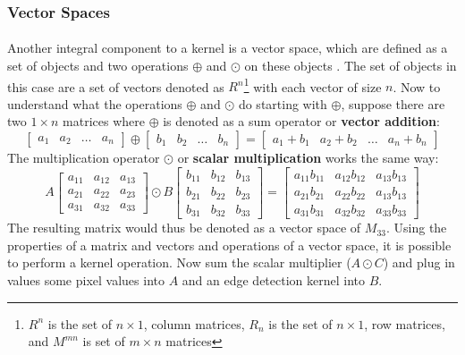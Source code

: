 \documentclass[11pt]{article}
\newcommand\simpleparagraph[1]{%
	\stepcounter{paragraph}\paragraph*{\theparagraph\quad{}#1}}
\renewcommand\theparagraph{}
\begin{document}
\subsubsection{Vector Spaces}
\simpleparagraph{}
Another integral component to a kernel is a vector space, which are defined as a set of objects and two operations $\oplus$ and $\odot$ on these objects \cite{weisstein_vector_2018}. The set of objects in this case are a set of vectors denoted as $R^{n}$\footnote{$R^{n}$ is the set of $n\times 1$, column matrices, $R_{n}$ is the set of $n\times 1$, row matrices, and $M^{mn}$ is set of $m\times n$ matrices} with each vector of size $n$. Now to understand what the operations $\oplus$ and $\odot$ do starting with $\oplus$, suppose there are two $1\times n$ matrices where $\oplus$ is denoted as a sum operator or \textbf{vector addition}:
{ \small
\begin{equation}
	\begin{bmatrix}
	a_{1} & a_{2} & \dots & a_{n}
	\end{bmatrix}
	\oplus
	\begin{bmatrix}
	b_{1} & b_{2} & \dots & b_{n}
	\end{bmatrix}
	=
	\begin{bmatrix}
	a_{1}+b_{1} & a_{2}+b_{2} & \dots & a_{n}+b_{n}
	\end{bmatrix}
\end{equation}
}
The multiplication operator $\odot$ or \textbf{scalar multiplication} works the same way:
{ \small
\begin{equation}
	A
	\begin{bmatrix}
	a_{11} & a_{12} & a_{13}\\
	a_{21} & a_{22} & a_{23}\\
	a_{31} & a_{32} & a_{33}
	\end{bmatrix}
	\odot
	B
	\begin{bmatrix}
	b_{11} & b_{12} & b_{13}\\
	b_{21} & b_{22} & b_{23}\\
	b_{31} & b_{32} & b_{33}
	\end{bmatrix}
	=
	\begin{bmatrix}
	a_{11}b_{11} & a_{12}b_{12} & a_{13}b_{13}\\
	a_{21}b_{21} & a_{22}b_{22} & a_{13}b_{13}\\
	a_{31}b_{31} & a_{32}b_{32} & a_{33}b_{33}
	\end{bmatrix}
\end{equation}
}
The resulting matrix would thus be denoted as a vector space of $M_{33}$. Using the properties of a matrix and vectors and operations of a vector space, it is possible to perform a kernel operation. Now sum the scalar multiplier ($A\odot C$) and plug in values some pixel values into $A$ and an edge detection kernel into $B$.
\end{document}
